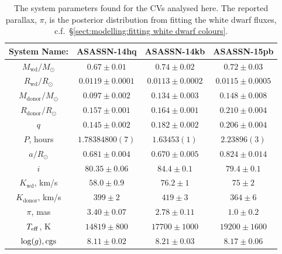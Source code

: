 \begin{table}
    \centering
    \caption{The system parameters found for the CVs analysed here. The reported parallax, $\pi$, is the posterior distribution from fitting the white dwarf fluxes, c.f.~\S\ref{sect:modelling:fitting white dwarf colours}.}
    \label{table:12 new cvs:system_parameters}
    \begin{tabular}{cccc}
        \hline
        \textbf{System Name:}      & \textbf{ASASSN-14hq}    & \textbf{ASASSN-14kb}     & \textbf{ASASSN-15pb}  \\
        \hline
        \hline
        $M_\mathrm{wd}/M_\odot$    & $0.67\pm0.01$           & $0.74\pm0.02$            & $0.72\pm0.03$         \\
        $R_\mathrm{wd}/R_\odot$    & $0.0119\pm0.0001$       & $0.0113\pm0.0002$        & $0.0115\pm0.0005$     \\
        $M_\mathrm{donor}/M_\odot$ & $0.097\pm0.002$         & $0.134\pm0.003$          & $0.148\pm0.008$       \\
        $R_\mathrm{donor}/R_\odot$ & $0.157\pm0.001$         & $0.164\pm0.001$          & $0.210\pm0.004$       \\
        $q$                        & $0.145\pm0.002$         & $0.182\pm0.002$          & $0.206\pm0.004$       \\
        \hline
        $P$, hours                 & $1.78384800(7)$         & $1.63453(1)$             & $2.23896(3)$          \\
        $a/R_\odot$                & $0.681\pm0.004$         & $0.670\pm0.005$          & $0.824\pm0.014$       \\
        $i$                        & $80.35\pm0.06$          & $84.4\pm0.1$             & $79.4\pm0.1$          \\
        $K_\mathrm{wd}$, km/s      & $58.0\pm0.9$            & $76.2\pm1$               & $75\pm2$              \\
        $K_\mathrm{donor}$, km/s   & $399\pm2$               & $419\pm3$                & $364\pm6$             \\
        \hline
        $\pi$, mas                 & $3.40\pm0.07$           & $2.78\pm0.11$            & $1.0\pm0.2$           \\
        $T_{\rm eff}$, K           & $14819\pm800$           & $17700\pm1000$           & $19200\pm1600$        \\
        $\log(g), {\rm cgs}$       & $8.11\pm0.02$           & $8.21\pm0.03$            & $8.17\pm0.06$         \\

\end{tabular}
\end{table}
